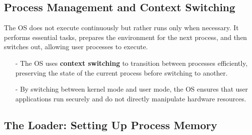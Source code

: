 \documentclass[../../compsys.tex]{subfiles}
\begin{document}
\subsection{Process Management and Context Switching}

The OS does not execute continuously but rather runs only when necessary. It performs essential tasks, prepares the environment for the next process, and then switches out, allowing user processes to execute.

\begin{itemize}
  \item[-] The OS uses \textbf{context switching} to transition between processes efficiently, preserving the state of the current process before switching to another.
  \item[-] By switching between kernel mode and user mode, the OS ensures that user applications run securely and do not directly manipulate hardware resources.
\end{itemize}

\subsection*{The Loader: Setting Up Process Memory}
\end{document}
